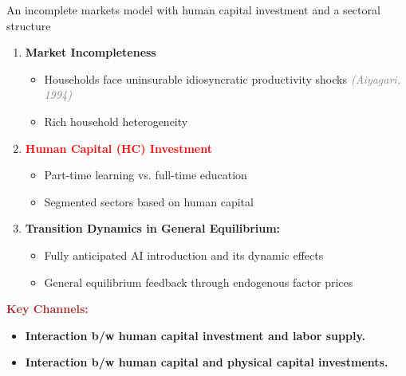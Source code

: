 \documentclass[serif, aspectratio=169]{beamer}
\theoremstyle{remark}
\theoremstyle{plain}
\begin{document}
\begin{frame}{An incomplete markets model with human capital investment
and a sectoral structure}
\begin{enumerate}
\item \textbf{Market Incompleteness}
\begin{itemize}
\item Households face uninsurable idiosyncratic productivity
shocks\textit{\textcolor{gray}{{} (Aiyagari, 1994)}}
\item Rich household heterogeneity
\end{itemize}
\smallskip
\item \textbf{\textcolor{red}{Human Capital (HC) Investment }}
\begin{itemize}
\item Part-time learning vs. full-time education
\item Segmented sectors based on human capital
\end{itemize}
\smallskip
\item \textbf{Transition Dynamics in General Equilibrium:}
\begin{itemize}
\item Fully anticipated AI introduction and its dynamic effects
\item General equilibrium feedback through endogenous factor prices
\end{itemize}
\end{enumerate}
\smallskip
\textbf{\textcolor{brown}{Key Channels:}}\textcolor{brown}{{} }
\begin{itemize}

\item \textbf{Interaction b/w human capital investment and labor supply.}
\item \textbf{Interaction b/w human capital and physical capital investments.}
\end{itemize}

\end{frame}
\end{document}
